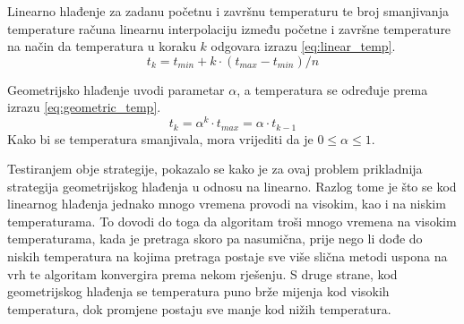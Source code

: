 Linearno hlađenje za zadanu početnu i završnu temperaturu te broj smanjivanja temperature računa linearnu interpolaciju između početne i završne temperature na način da temperatura u koraku $k$ odgovara izrazu \eqref{eq:linear_temp}.
\begin{equation}
\label{eq:linear_temp}
    t_k = t_{min} + k \cdot \left( t_{max} - t_{min} \right) / n
\end{equation}

Geometrijsko hlađenje uvodi parametar $\alpha$, a temperatura se određuje prema izrazu \eqref{eq:geometric_temp}.
\begin{equation}
\label{eq:geometric_temp}
    t_k = \alpha^k \cdot t_{max} = \alpha \cdot t_{k-1}
\end{equation}
Kako bi se temperatura smanjivala, mora vrijediti da je $0 \le \alpha \le 1$.

Testiranjem obje strategije, pokazalo se kako je za ovaj problem prikladnija strategija geometrijskog hlađenja u odnosu na linearno.
Razlog tome je što se kod linearnog hlađenja jednako mnogo vremena provodi na visokim, kao i na niskim temperaturama.
To dovodi do toga da algoritam troši mnogo vremena na visokim temperaturama, kada je pretraga skoro pa nasumična, prije nego li dođe do niskih temperatura na kojima pretraga postaje sve više slična metodi uspona na vrh te algoritam konvergira prema nekom rješenju.
S druge strane, kod geometrijskog hlađenja se temperatura puno brže mijenja kod visokih temperatura, dok promjene postaju sve manje kod nižih temperatura.

